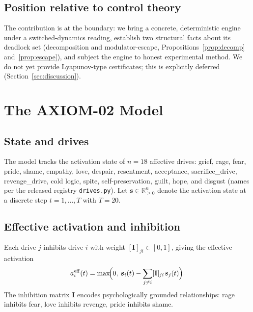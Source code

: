 \documentclass[journal]{IEEEtran}
\newcommand{\R}{\mathbb{R}}
\newcommand{\bs}{\mathbf{s}}
\newcommand{\bI}{\mathbf{I}}
\begin{document}
\subsection{Position relative to control theory}
The contribution is at the boundary: we bring a concrete, deterministic
engine under a switched-dynamics reading, establish two structural
facts about its deadlock set (decomposition and modulator-escape,
Propositions~\ref{prop:decomp} and~\ref{prop:escape}), and subject the
engine to honest experimental method. We do not yet provide
Lyapunov-type certificates; this is explicitly deferred
(Section~\ref{sec:discussion}).

\section{The AXIOM-02 Model}
\label{sec:framework}

\subsection{State and drives}
The model tracks the activation state of $n=18$ affective drives:
grief, rage, fear, pride, shame, empathy, love, despair, resentment,
acceptance, sacrifice\_drive, revenge\_drive, cold logic, spite,
self-preservation, guilt, hope, and disgust (names per the released
registry \texttt{drives.py}). Let $\bs\in\R_{\ge0}^{n}$ denote the
activation state at a discrete step $t=1,\dots,T$ with $T=20$.

\subsection{Effective activation and inhibition}
Each drive $j$ inhibits drive $i$ with weight $[\bI]_{ji}\in[0,1]$,
giving the effective activation
\begin{equation}
\label{eq:effective}
a_i^{\mathrm{eff}}(t)=\max\!\Bigl(0,\; \bs_i(t)-
\sum_{j\neq i}[\bI]_{ji}\,\bs_j(t)\Bigr).
\end{equation}
The inhibition matrix $\bI$ encodes psychologically grounded
relationships: rage inhibits fear, love inhibits revenge, pride inhibits
shame.
\end{document}
